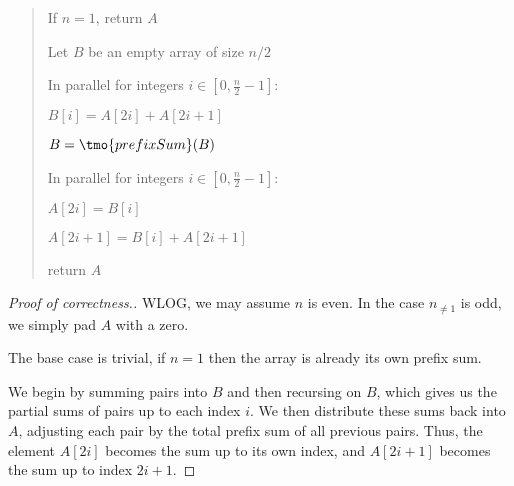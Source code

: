 \documentclass[10pt]{article}
\begin{document}
\begin{quote}

\begin{steps}
  \item If \( n=1 \), return \( A \)
  \item Let \( B \) be an empty array of size \( n/2 \)
  \item In parallel for integers \( i\in [0, \frac{n}{2}-1] \): %
  \begin{steps}
    \item \( B[i] = A[2i] + A[2i + 1] \)
  \end{steps}
  \item \( B = \tmo{prefixSum}(B) \) %
  \item In parallel for integers \( i \in [0, \frac{n}{2}-1] \):
  \begin{steps}
    \item \( A[2i] = B[i] \)
    \item \( A[2i+1] = B[i] + A[2i+1] \)
  \end{steps}
  \item return \( A \)
\end{steps}
\end{quote}

\begin{proof}[Proof of correctness.]
  WLOG, we may assume \( n \) is even.
  In the case \( n_{\neq 1} \) is odd, we simply pad \( A \) with a zero.

  The base case is trivial, if \( n=1 \) then the array is already its own prefix sum.

  We begin by summing pairs into \( B \) and then recursing on \( B \), which gives us the partial sums of pairs up to each index \( i \).
  We then distribute these sums back into \( A \), adjusting each pair by the total prefix sum of all previous pairs.
  Thus, the element \( A[2i] \) becomes the sum up to its own index, and \( A[2i+1] \) becomes the sum up to index \( 2i+1 \).
\end{proof}
\end{document}
